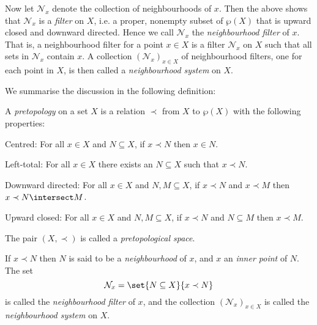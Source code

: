 \documentclass[article, a4paper, 11pt, oneside]{memoir}
\numberwithin{equation}{chapter}
\newcommand{\inpoint}{\prec}
\newcommand{\calN}{\mathcal{N}}
\newcommand{\nhoods}[1]{\calN_{#1}}
\renewcommand{\powerset}[1]{\wp(#1)}
\begin{document}
%

Now let $\nhoods{x}$ denote the collection of neighbourhoods of $x$. Then the above shows that $\nhoods{x}$ is a \emph{filter} on $X$, i.e. a proper, nonempty subset of $\powerset{X}$ that is upward closed and downward directed. Hence we call $\nhoods{x}$ the \emph{neighbourhood filter} of $x$. That is, a neighbourhood filter for a point $x \in X$ is a filter $\nhoods{x}$ on $X$ such that all sets in $\nhoods{x}$ contain $x$. A collection $(\nhoods{x})_{x \in X}$ of neighbourhood filters, one for each point in $X$, is then called a \emph{neighbourhood system} on $X$.

We summarise the discussion in the following definition:

\begin{definition}
    A \emph{pretopology} on a set $X$ is a relation $\inpoint$ from $X$ to $\powerset{X}$ with the following properties:
    \begin{enumdef}
        \item Centred: For all $x \in X$ and $N \subseteq X$, if $x \inpoint N$ then $x \in N$.

        \item Left-total: For all $x \in X$ there exists an $N \subseteq X$ such that $x \inpoint N$.

        \item Downward directed: For all $x \in X$ and $N,M \subseteq X$, if $x \inpoint N$ and $x \inpoint M$ then $x \inpoint N \intersect M$.

        \item Upward closed: For all $x \in X$ and $N,M \subseteq X$, if $x \inpoint N$ and $N \subseteq M$ then $x \inpoint M$.
    \end{enumdef}
    The pair $(X,\inpoint)$ is called a \emph{pretopological space}.

    If $x \inpoint N$ then $N$ is said to be a \emph{neighbourhood} of $x$, and $x$ an \emph{inner point} of $N$. The set
    \begin{equation*}
        \nhoods{x} = \set{N \subseteq X}{x \inpoint N}
    \end{equation*}
    is called the \emph{neighbourhood filter} of $x$, and the collection $(\nhoods{x})_{x \in X}$ is called the \emph{neighbourhood system} on $X$.
\end{definition}
\end{document}
